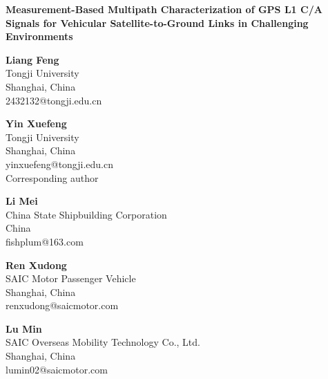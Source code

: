 \documentclass[10pt]{article}
\begin{document}
\begin{center}
{\LARGE\bfseries Measurement-Based Multipath Characterization of GPS L1 C/A Signals for Vehicular Satellite-to-Ground Links in Challenging Environments\par}
\vspace{6pt}
\begin{minipage}[t]{0.185\textwidth}\centering\footnotesize
\textbf{Liang Feng}\\
Tongji University\\
Shanghai, China\\
2432132@tongji.edu.cn
\end{minipage}\hfill
\begin{minipage}[t]{0.185\textwidth}\centering\footnotesize
\textbf{Yin Xuefeng}\\
Tongji University\\
Shanghai, China\\
yinxuefeng@tongji.edu.cn\\
{\scriptsize Corresponding author}
\end{minipage}\hfill
\begin{minipage}[t]{0.185\textwidth}\centering\footnotesize
\textbf{Li Mei}\\
China State Shipbuilding Corporation\\
China\\
fishplum@163.com
\end{minipage}\hfill
\begin{minipage}[t]{0.185\textwidth}\centering\footnotesize
\textbf{Ren Xudong}\\
SAIC Motor Passenger Vehicle\\
Shanghai, China\\
renxudong@saicmotor.com
\end{minipage}\hfill
\begin{minipage}[t]{0.185\textwidth}\centering\footnotesize
\textbf{Lu Min}\\
SAIC Overseas Mobility Technology Co., Ltd.\\
Shanghai, China\\
lumin02@saicmotor.com
\end{minipage}
\end{center}
\end{document}
